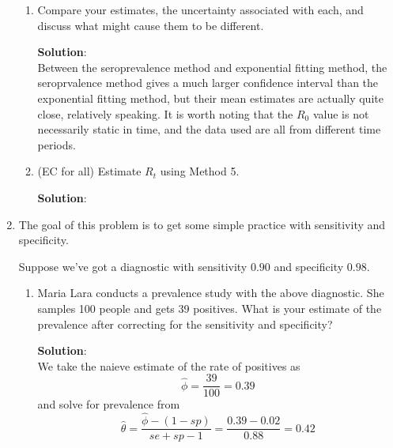 \documentclass[11pt]{article}
\begin{document}
\begin{enumerate}
\begin{enumerate}[label=\alph*.]
	\item Compare your estimates, the uncertainty associated with each, and discuss what might cause them to be different.
	
	\begin{tcolorbox}[breakable]
	\textbf{Solution}:\\
		Between the seroprevalence method and exponential fitting method, the seroprvalence method gives a much larger confidence interval than the exponential fitting method, but their mean estimates are actually quite close, relatively speaking. It is worth noting that the $R_0$ value is not necessarily static in time, and the data used are all from different time periods. 
	\end{tcolorbox}
	
	\item (EC for all) Estimate $R_t$ using Method 5.
	
	\begin{tcolorbox}[breakable]
	\textbf{Solution}:\\
		
	\end{tcolorbox}
	
\end{enumerate}

\clearpage
\item The goal of this problem is to get some simple practice with sensitivity and specificity. 

Suppose we've got a diagnostic with sensitivity $0.90$ and specificity $0.98$. 

\begin{enumerate}[label=\alph*.]
	\item Maria Lara conducts a prevalence study with the above diagnostic. She samples 100 people and gets 39 positives. What is your estimate of the prevalence after correcting for the sensitivity and specificity? 
	
	\begin{tcolorbox}[breakable]
		\textbf{Solution}:\\
		We take the naieve estimate of the rate of positives as 
		\begin{equation*}
			\hat{\phi}=\frac{39}{100}=0.39
		\end{equation*}
		and solve for prevalence from 
		\begin{equation*}
			\hat{\theta}=\frac{\hat{\phi}-(1-sp)}{se+sp-1}=\frac{0.39-0.02}{0.88}=0.42
		\end{equation*}
	\end{tcolorbox}
	

\end{enumerate}
\end{enumerate}
\end{document}
